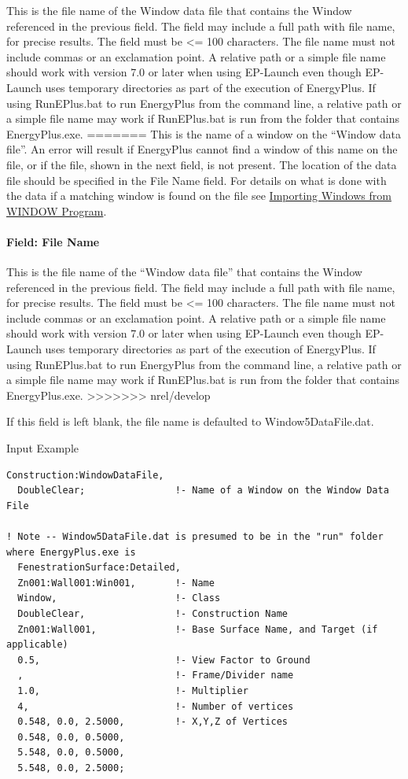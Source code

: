 This is the file name of the Window data file that contains the Window referenced in the previous field. The field may include a full path with file name, for precise results. The field must be \textless{}= 100 characters. The file name must not include commas or an exclamation point. A relative path or a simple file name should work with version 7.0 or later when using EP-Launch even though EP-Launch uses temporary directories as part of the execution of EnergyPlus. If using RunEPlus.bat to run EnergyPlus from the command line, a relative path or a simple file name may work if RunEPlus.bat is run from the folder that contains EnergyPlus.exe.
=======
This is the name of a window on the ``Window data file''. An error will result if EnergyPlus cannot find a window of this name on the file, or if the file, shown in the next field, is not present. The location of the data file should be specified in the File Name field. For details on what is done with the data if a matching window is found on the file see \hyperref[importing-windows-from-window-program]{Importing Windows from WINDOW Program}.

\paragraph{Field: File Name}\label{field-file-name-000}

This is the file name of the ``Window data file'' that contains the Window referenced in the previous field. The field may include a full path with file name, for precise results. The field must be \textless{}= 100 characters. The file name must not include commas or an exclamation point. A relative path or a simple file name should work with version 7.0 or later when using EP-Launch even though EP-Launch uses temporary directories as part of the execution of EnergyPlus. If using RunEPlus.bat to run EnergyPlus from the command line, a relative path or a simple file name may work if RunEPlus.bat is run from the folder that contains EnergyPlus.exe.
>>>>>>> nrel/develop

If this field is left blank, the file name is defaulted to Window5DataFile.dat.

Input Example

\begin{lstlisting}
Construction:WindowDataFile,
  DoubleClear;                !- Name of a Window on the Window Data File

! Note -- Window5DataFile.dat is presumed to be in the "run" folder where EnergyPlus.exe is
  FenestrationSurface:Detailed,
  Zn001:Wall001:Win001,       !- Name
  Window,                     !- Class
  DoubleClear,                !- Construction Name
  Zn001:Wall001,              !- Base Surface Name, and Target (if applicable)
  0.5,                        !- View Factor to Ground
  ,                           !- Frame/Divider name
  1.0,                        !- Multiplier
  4,                          !- Number of vertices
  0.548, 0.0, 2.5000,         !- X,Y,Z of Vertices
  0.548, 0.0, 0.5000,
  5.548, 0.0, 0.5000,
  5.548, 0.0, 2.5000;
\end{lstlisting}

